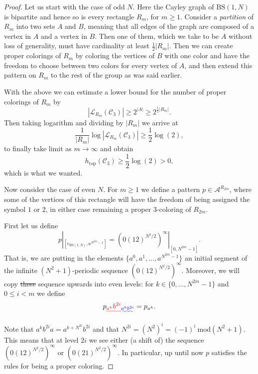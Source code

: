 \documentclass[cupthm,crop,info]{CUP-JNL-ETS}%
\theoremstyle{cupplain}
\theoremstyle{cupdefinition}
\theoremstyle{cupremark}
\theoremstyle{cupproof}
\newtheorem{proof}{Proof}
\numberwithin{equation}{section}
\newcommand{\BS}[1][N]{\mathrm{BS}(1,#1)}
\def\htop{h_{\mathrm{top}}}
\providecommand{\DIFadd}[1]{{\protect\color{blue}\uwave{#1}}} %
\providecommand{\DIFdel}[1]{{\protect\color{red}\sout{#1}}}                      %
\providecommand{\DIFaddbegin}{} %
\providecommand{\DIFaddend}{} %
\providecommand{\DIFdelbegin}{} %
\providecommand{\DIFdelend}{} %
\newcommand{\DIFscaledelfig}{0.5}
\newlength{\DIFdelgraphicswidth} %
\newlength{\DIFdelgraphicsheight} %
\newcommand{\DIFaddincludegraphics}[2][]{{\color{blue}\fbox{\DIFOincludegraphics[#1]{#2}}}} %
\newcommand{\DIFdelincludegraphics}[2][]{%
\sbox{\DIFdelgraphicsbox}{\DIFOincludegraphics[#1]{#2}}%
\settoboxwidth{\DIFdelgraphicswidth}{\DIFdelgraphicsbox} %
\settoboxtotalheight{\DIFdelgraphicsheight}{\DIFdelgraphicsbox} %
\scalebox{\DIFscaledelfig}{%
\parbox[b]{\DIFdelgraphicswidth}{\usebox{\DIFdelgraphicsbox}\\[-\baselineskip] \rule{\DIFdelgraphicswidth}{0em}}\llap{\resizebox{\DIFdelgraphicswidth}{\DIFdelgraphicsheight}{%
\setlength{\unitlength}{\DIFdelgraphicswidth}%
\begin{picture}(1,1)%
\thicklines\linethickness{2pt} %
{\color[rgb]{1,0,0}\put(0,0){\framebox(1,1){}}}%
{\color[rgb]{1,0,0}\put(0,0){\line( 1,1){1}}}%
{\color[rgb]{1,0,0}\put(0,1){\line(1,-1){1}}}%
\end{picture}%
}\hspace*{3pt}}} %
} %
\DeclareRobustCommand{\DIFaddbegin}{\DIFOaddbegin \let\includegraphics\DIFaddincludegraphics} %
\DeclareRobustCommand{\DIFaddend}{\DIFOaddend \let\includegraphics\DIFOincludegraphics} %
\DeclareRobustCommand{\DIFdelbegin}{\DIFOdelbegin \let\includegraphics\DIFdelincludegraphics} %
\DeclareRobustCommand{\DIFdelend}{\DIFOaddend \let\includegraphics\DIFOincludegraphics} %
\begin{document}
\begin{proof}
	Let us start with the case of odd $N$. Here the Cayley graph of $\BS$ is bipartite and hence so is every rectangle $R_m$, for $m\ge 1$. Consider a \textit{partition} of $R_m$ into two sets $A$ and $B$, meaning that all edges of the graph are composed of a vertex in $A$ and a vertex in $B$. Then one of them, which we take to be $A$ without loss of generality, must have cardinality at least $\frac{1}{2}|R_m|$. Then we can create proper colorings of $R_m$ by coloring the vertices of $B$ with one color and have the freedom to choose between two colors for every vertex of $A$, and then extend this pattern on $R_m$ to the rest of the group as was said earlier.

	With the above we can estimate a lower bound for the number of proper colorings of $R_m$ by
	$$
	|\mathcal{L}_{R_m}(\mathcal{C}_3)|\ge 2^{|A|}\ge 2^{\frac{1}{2}|R_m|}.
	$$
	Then taking logarithm and dividing by $|R_m|$ we arrive at
	$$
	\frac{1}{|R_m|}\log |\mathcal{L}_{R_m}(\mathcal{C}_3)| \ge \frac{1}{2}\log (2),
	$$
	to finally take limit as $m\to \infty$ and obtain
	$$
	\htop(\mathcal{C}_3)\ge \frac{1}{2}\log(2)>0,
	$$
	which is what we wanted.

	
	Now consider the case of even $N$. For $m\ge 1$ we define a pattern $p\in \mathcal{A}^{R_{2m}}$, where some of the vertices of this rectangle will have the freedom of being assigned the symbol $1$ or $2$, in either case remaining a proper $3$-coloring of $R_{2m}$.

	First let us define 
	$$
	p|_{[e_{\BS},a^{N^{2m}-1}]}=(0(12)^{N^2/2})^{\infty}|_{[0,N^{2m}-1]}.
	$$
	That is, we are putting in the elements $\{a^{0},a^{1},\ldots,a^{N^{2m}-1}\}$ an initial segment of the infinite $(N^2+1)$-periodic sequence \DIFdelbegin \DIFdel{$(0(12)^{N^2/2})^{\infty}$}\DIFdelend \DIFaddbegin \DIFadd{$\left(0(12)^{N^2/2}\right)^{\infty}$}\DIFaddend . Moreover, we will copy \DIFdelbegin \DIFdel{these }\DIFdelend \DIFaddbegin \DIFadd{this }\DIFaddend sequence upwards into even levels: for $k\in \{0,\ldots,N^{2m}-1\}$ and $0\le i<m$ we define
	$$
	p\DIFdelbegin \DIFdel{_{a^{k}}b^{2i}}\DIFdelend \DIFaddbegin \DIFadd{_{a^{k}b^{2i}}}\DIFaddend =p_{a^k}.
	$$

	Note that $a^kb^{2i}a=a^{k+N^{2i}}b^{2i}$ and that $N^{2i}=(N^{2})^i=(-1)^{i}\ \mathrm{mod}(N^2+1)$. This means that at level $2i$ we see either (a shift of) the sequence $(0(12)^{N^2/2})^{\infty}$ or $(0(21)^{N^2/2})^{\infty}$. In particular, up until now $p$ satisfies the rules for being a proper coloring.


\end{proof}
\end{document}
